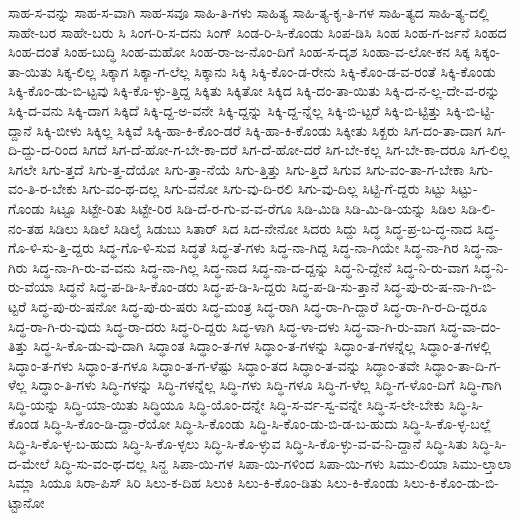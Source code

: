 {ಸಾಹ-ಸ-ವನ್ನು
ಸಾಹ-ಸ-ವಾಗಿ
ಸಾಹ-ಸವೂ
ಸಾಹಿ-ತಿ-ಗಳು
ಸಾಹಿತ್ಯ
ಸಾಹಿ-ತ್ಯ-ಕೃ-ತಿ-ಗಳ
ಸಾಹಿ-ತ್ಯದ
ಸಾಹಿ-ತ್ಯ-ದಲ್ಲಿ
ಸಾಹೇ-ಬರ
ಸಾಹೇ-ಬರು
ಸಿ
ಸಿಂಗ-ರಿ-ಸ-ದನು
ಸಿಂಗ್
ಸಿಂಡ-ರಿ-ಸಿ-ಕೊಂಡು
ಸಿಂಪ-ಡಿಸಿ
ಸಿಂಹ
ಸಿಂಹ-ಗ-ರ್ಜನೆ
ಸಿಂಹದ
ಸಿಂಹ-ದಂತೆ
ಸಿಂಹ-ಬುದ್ಧಿ
ಸಿಂಹ-ಮಹೋ
ಸಿಂಹ-ರಾ-ಜ-ನೊಂ-ದಿಗೆ
ಸಿಂಹ-ಸ-ದೃಶ
ಸಿಂಹಾ-ವ-ಲೋ-ಕನ
ಸಿಕ್ಕ
ಸಿಕ್ಕಂ-ತಾ-ಯಿತು
ಸಿಕ್ಕ-ಲಿಲ್ಲ
ಸಿಕ್ಕಾಗ
ಸಿಕ್ಕಾ-ಗ-ಲೆಲ್ಲ
ಸಿಕ್ಕಾನು
ಸಿಕ್ಕಿ
ಸಿಕ್ಕಿ-ಕೊಂ-ಡ-ರೇನು
ಸಿಕ್ಕಿ-ಕೊಂ-ಡ-ವ-ರಂತೆ
ಸಿಕ್ಕಿ-ಕೊಂಡು
ಸಿಕ್ಕಿ-ಕೊಂ-ಡು-ಬಿ-ಟ್ಟವು
ಸಿಕ್ಕಿ-ಕೊ-ಳ್ಳು-ತ್ತಿದ್ದ
ಸಿಕ್ಕಿತು
ಸಿಕ್ಕಿತೋ
ಸಿಕ್ಕಿದ
ಸಿಕ್ಕಿ-ದಂ-ತಾ-ಯಿತು
ಸಿಕ್ಕಿ-ದ-ನ-ಲ್ಲ-ದೇ-ವ-ರನ್ನು
ಸಿಕ್ಕಿ-ದ-ವನು
ಸಿಕ್ಕಿ-ದಾಗ
ಸಿಕ್ಕಿದೆ
ಸಿಕ್ಕಿ-ದ್ದ-ಅ-ವನೇ
ಸಿಕ್ಕಿ-ದ್ದನ್ನು
ಸಿಕ್ಕಿ-ದ್ದ-ನ್ನೆಲ್ಲ
ಸಿಕ್ಕಿ-ಬಿ-ಟ್ಟರೆ
ಸಿಕ್ಕಿ-ಬಿ-ಟ್ಟಿತ್ತು
ಸಿಕ್ಕಿ-ಬಿ-ಟ್ಟಿ-ದ್ದಾನೆ
ಸಿಕ್ಕಿ-ಬೀಳು
ಸಿಕ್ಕಿಲ್ಲ
ಸಿಕ್ಕಿವೆ
ಸಿಕ್ಕಿ-ಹಾ-ಕಿ-ಕೊಂ-ಡರೆ
ಸಿಕ್ಕಿ-ಹಾ-ಕಿ-ಕೊಂಡು
ಸಿಕ್ಕೀತು
ಸಿಕ್ಖರು
ಸಿಗ-ದಂ-ತಾ-ದಾಗ
ಸಿಗ-ದಿ-ದ್ದು-ದ-ರಿಂದ
ಸಿಗದೆ
ಸಿಗ-ದೆ-ಹೋ-ಗ-ಬೇ-ಕಾ-ದರೆ
ಸಿಗ-ದೆ-ಹೋ-ದರೆ
ಸಿಗ-ಬೇ-ಕಲ್ಲ
ಸಿಗ-ಬೇ-ಕಾ-ದರೂ
ಸಿಗ-ಲಿಲ್ಲ
ಸಿಗಲೇ
ಸಿಗು-ತ್ತದೆ
ಸಿಗು-ತ್ತ-ದೆಯೋ
ಸಿಗು-ತ್ತಾ-ನೆಯೆ
ಸಿಗು-ತ್ತಿತ್ತು
ಸಿಗು-ತ್ತಿದೆ
ಸಿಗುವ
ಸಿಗು-ವಂ-ತಾ-ಗ-ಬೇಕಾ
ಸಿಗು-ವಂ-ತಿ-ರ-ಬೇಕು
ಸಿಗು-ವಂ-ಥ-ದಲ್ಲ
ಸಿಗು-ವನೋ
ಸಿಗು-ವು-ದಿ-ರಲಿ
ಸಿಗು-ವು-ದಿಲ್ಲ
ಸಿಟ್ಟಿ-ಗೆ-ದ್ದರು
ಸಿಟ್ಟು
ಸಿಟ್ಟು-ಗೊಂಡು
ಸಿಟ್ಟೂ
ಸಿಟ್ಟೇ-ರಿತು
ಸಿಟ್ಟೇ-ರಿರ
ಸಿಡಿ-ದೆ-ರ-ಗು-ವ-ವ-ರೆಗೂ
ಸಿಡಿ-ಮಿಡಿ
ಸಿಡಿ-ಮಿ-ಡಿ-ಯನ್ನು
ಸಿಡಿಲ
ಸಿಡಿ-ಲಿ-ನಂ-ತಹ
ಸಿಡಿಲು
ಸಿಡಿಲೆ
ಸಿಡಿಲೈ
ಸಿಡುಬು
ಸಿತಾರ್
ಸಿದ
ಸಿದ-ನೇನೋ
ಸಿದರು
ಸಿದ್ದು
ಸಿದ್ಧ
ಸಿದ್ಧ-ಪ್ರ-ಬ-ದ್ಧ-ನಾದ
ಸಿದ್ಧ-ಗೊ-ಳಿ-ಸು-ತ್ತಿ-ದ್ದರು
ಸಿದ್ಧ-ಗೊ-ಳಿ-ಸುವ
ಸಿದ್ಧತೆ
ಸಿದ್ಧ-ತೆ-ಗಳು
ಸಿದ್ಧ-ನಾ-ಗಿದ್ದ
ಸಿದ್ಧ-ನಾ-ಗಿಯೇ
ಸಿದ್ಧ-ನಾ-ಗಿರ
ಸಿದ್ಧ-ನಾ-ಗಿರು
ಸಿದ್ಧ-ನಾ-ಗಿ-ರು-ವ-ವನು
ಸಿದ್ಧ-ನಾ-ಗಿಲ್ಲ
ಸಿದ್ಧ-ನಾದ
ಸಿದ್ಧ-ನಾ-ದ-ದ್ದನ್ನು
ಸಿದ್ಧ-ನಿ-ದ್ದೇನೆ
ಸಿದ್ಧ-ನಿ-ರು-ವಾಗ
ಸಿದ್ಧ-ನಿ-ರು-ವೆಯಾ
ಸಿದ್ಧನೆ
ಸಿದ್ಧ-ಪ-ಡಿ-ಸಿ-ಕೊಂ-ಡರು
ಸಿದ್ಧ-ಪ-ಡಿ-ಸಿ-ದ್ದರು
ಸಿದ್ಧ-ಪ-ಡಿ-ಸು-ತ್ತಾನೆ
ಸಿದ್ಧ-ಪು-ರು-ಷ-ನಾ-ಗಿ-ಬಿ-ಟ್ಟರೆ
ಸಿದ್ಧ-ಪು-ರು-ಷನೋ
ಸಿದ್ಧ-ಪು-ರು-ಷರು
ಸಿದ್ಧ-ಮಂತ್ರ
ಸಿದ್ಧ-ರಾಗಿ
ಸಿದ್ಧ-ರಾ-ಗಿ-ದ್ದಾರೆ
ಸಿದ್ಧ-ರಾ-ಗಿ-ರ-ದಿ-ದ್ದರೂ
ಸಿದ್ಧ-ರಾ-ಗಿ-ರು-ವುದು
ಸಿದ್ಧ-ರಾ-ದರು
ಸಿದ್ಧ-ರಿ-ದ್ದರು
ಸಿದ್ಧ-ಳಾಗಿ
ಸಿದ್ಧ-ಳಾ-ದಳು
ಸಿದ್ಧ-ವಾ-ಗಿ-ರು-ವಾಗ
ಸಿದ್ಧ-ವಾ-ದಂ-ತಿತ್ತು
ಸಿದ್ಧ-ಸಿ-ಕೊ-ಡು-ವು-ದಾಗಿ
ಸಿದ್ಧಾಂತ
ಸಿದ್ಧಾಂ-ತ-ಗಳ
ಸಿದ್ಧಾಂ-ತ-ಗಳನ್ನು
ಸಿದ್ಧಾಂ-ತ-ಗಳನ್ನೆಲ್ಲ
ಸಿದ್ಧಾಂ-ತ-ಗಳಲ್ಲಿ
ಸಿದ್ಧಾಂ-ತ-ಗಳು
ಸಿದ್ಧಾಂ-ತ-ಗಳೂ
ಸಿದ್ಧಾಂ-ತ-ಗ-ಳೆಷ್ಟು
ಸಿದ್ಧಾಂ-ತದ
ಸಿದ್ಧಾಂ-ತ-ವನ್ನು
ಸಿದ್ಧಾಂ-ತವೇ
ಸಿದ್ಧಾಂ-ತಾ-ದಿ-ಗ-ಳೆಲ್ಲ
ಸಿದ್ಧಾಂ-ತಿ-ಗಳು
ಸಿದ್ಧಿ-ಗಳನ್ನು
ಸಿದ್ಧಿ-ಗಳನ್ನೆಲ್ಲ
ಸಿದ್ಧಿ-ಗಳು
ಸಿದ್ಧಿ-ಗಳೂ
ಸಿದ್ಧಿ-ಗ-ಳೆಲ್ಲ
ಸಿದ್ಧಿ-ಗ-ಳೊಂ-ದಿಗೆ
ಸಿದ್ಧಿ-ಗಾಗಿ
ಸಿದ್ಧಿ-ಯನ್ನು
ಸಿದ್ಧಿ-ಯಾ-ಯಿತು
ಸಿದ್ಧಿಯೂ
ಸಿದ್ಧಿ-ಯೊಂ-ದನ್ನೇ
ಸಿದ್ಧಿ-ಸ-ರ್ವ-ಸ್ವ-ವನ್ನೇ
ಸಿದ್ಧಿ-ಸ-ಲೇ-ಬೇಕು
ಸಿದ್ಧಿ-ಸಿ-ಕೊಂಡ
ಸಿದ್ಧಿ-ಸಿ-ಕೊಂ-ಡಿ-ದ್ದಾ-ರೆಯೋ
ಸಿದ್ಧಿ-ಸಿ-ಕೊಂಡು
ಸಿದ್ಧಿ-ಸಿ-ಕೊಂ-ಡು-ಬಿ-ಡ-ಬ-ಹುದು
ಸಿದ್ಧಿ-ಸಿ-ಕೊ-ಳ್ಳ-ಬಲ್ಲೆ
ಸಿದ್ಧಿ-ಸಿ-ಕೊ-ಳ್ಳ-ಬ-ಹುದು
ಸಿದ್ಧಿ-ಸಿ-ಕೊ-ಳ್ಳಲು
ಸಿದ್ಧಿ-ಸಿ-ಕೊ-ಳ್ಳುವ
ಸಿದ್ಧಿ-ಸಿ-ಕೊ-ಳ್ಳು-ವ-ವ-ನಿ-ದ್ದಾನೆ
ಸಿದ್ಧಿ-ಸಿತು
ಸಿದ್ಧಿ-ಸಿ-ದ-ಮೇಲೆ
ಸಿದ್ಧಿ-ಸು-ವಂ-ಥ-ದಲ್ಲ
ಸಿನ್ಹ
ಸಿಪಾ-ಯಿ-ಗಳ
ಸಿಪಾ-ಯಿ-ಗಳಿಂದ
ಸಿಪಾ-ಯಿ-ಗಳು
ಸಿಮು-ಲಿಯಾ
ಸಿಮು-ಲ್ತಾಲಾ
ಸಿಮ್ಲಾ
ಸಿಯೂ
ಸಿರಾ-ಪಿಸ್
ಸಿರಿ
ಸಿಲು-ಕ-ದಿಹ
ಸಿಲುಕಿ
ಸಿಲು-ಕಿ-ಕೊಂ-ಡಿತು
ಸಿಲು-ಕಿ-ಕೊಂಡು
ಸಿಲು-ಕಿ-ಕೊಂ-ಡು-ಬಿ-ಟ್ಟಾನೋ
}
